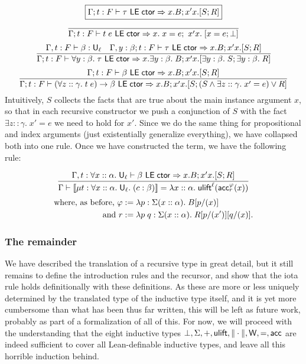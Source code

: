 $$\boxed{\Gamma;t:F\vdash \tau\LEctor\Rightarrow x.B;x'x.[S;R]}$$
$$\frac{}{\Gamma;t:F\vdash t\;e\LEctor\Rightarrow x.\;x=e;\ x'x.\;[x=e;\bot]}$$
$$\frac{\Gamma,t:F\vdash \beta:\U_\ell\quad \Gamma,y:\beta;t:F\vdash\tau\LEctor\Rightarrow x.B;x'x.[S;R]}
{\Gamma;t:F\vdash\forall y:\beta.\;\tau\LEctor\Rightarrow x.\exists y:\beta.\;B;x'x.[\exists y:\beta.\;S;\exists y:\beta.\;R]}$$
$$\frac{\Gamma;t:F\vdash\beta\LEctor\Rightarrow x.B;x'x.[S;R]}{\Gamma;t:F\vdash(\forall z::\gamma.\;t\;e)\to\beta\LEctor\Rightarrow x.B;x'x.[S;(S\land\exists z::\gamma.\;x'=e)\lor R]}$$
Intuitively, $S$ collects the facts that are true about the main instance argument $x$, so that in each recursive constructor we push a conjunction of $S$ with the fact $\exists z::\gamma.\;x'=e$ we need to hold for $x'$. Since we do the same thing for propositional and index arguments (just existentially generalize everything), we have collapsed both into one rule. Once we have constructed the term, we have the following rule:

$$\frac{\Gamma,t:\forall x::\alpha.\;\U_\ell\vdash \beta\LEctor\Rightarrow x.B;x'x.[S;R]}
{\Gamma\vdash\scott{\mu t:\forall x::\alpha.\;\U_\ell.\;(c:\beta)}=\lambda x::\alpha.\;\ulift^\ell(\acc^\vph_r(x))}$$
\vspace{-5mm}
\begin{align*}
\mbox{where, as before, }\vph&:=\lambda p:\Sigma(x::\alpha).\; B[p/(x)]\\
\mbox{and }r&:=\lambda p\;q:\Sigma(x::\alpha).\;R[p/(x')][q/(x)].
\end{align*}

\subsubsection{The remainder}
We have described the translation of a recursive type in great detail, but it still remains to define the introduction rules and the recursor, and show that the iota rule holds definitionally with these definitions. As these are more or less uniquely determined by the translated type of the inductive type itself, and it is yet more cumbersome than what has been thus far written, this will be left as future work, probably as part of a formalization of all of this. For now, we will proceed with the understanding that the eight inductive types $\bot,\Sigma,+,\ulift,\|\cdot\|,\W,=,\acc$ are indeed sufficient to cover all Lean-definable inductive types, and leave all this horrible induction behind.
